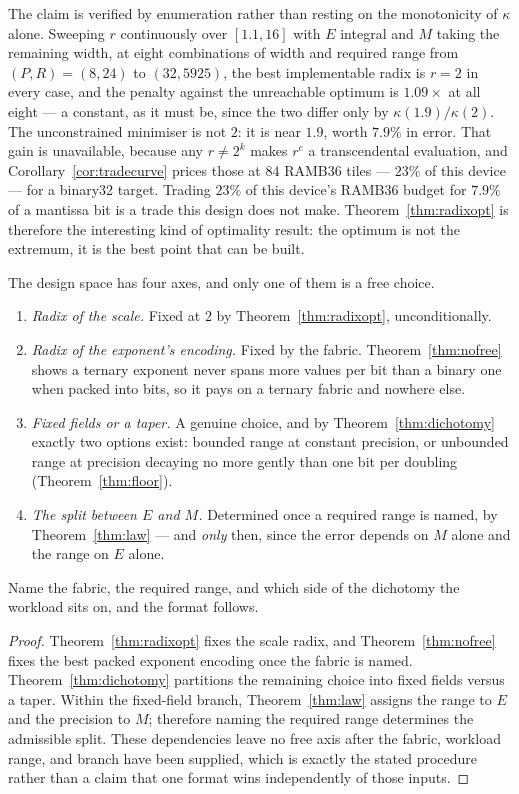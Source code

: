 The claim is verified by enumeration rather than resting on the monotonicity of
$\kappa$ alone. Sweeping $r$ continuously over $[1.1, 16]$ with $E$ integral and
$M$ taking the remaining width, at eight combinations of width and required range
from $(P,R) = (8, 24)$ to $(32, 5925)$, the best implementable radix is $r = 2$ in
every case, and the penalty against the unreachable optimum is $1.09\times$ at all
eight --- a constant, as it must be, since the two differ only by
$\kappa(1.9)/\kappa(2)$. The unconstrained minimiser is not $2$: it is near
$1.9$, worth $7.9\%$ in error. That gain is unavailable, because any
$r \neq 2^{k}$ makes $r^{e}$ a transcendental evaluation, and
Corollary~\ref{cor:tradecurve} prices those at $84$ RAMB36 tiles --- $23\%$ of
this device --- for a binary32 target. Trading $23\%$ of this device's RAMB36 budget for $7.9\%$ of a
mantissa bit is a trade this design does not make. Theorem~\ref{thm:radixopt} is therefore
the interesting kind of optimality result: the optimum is not the extremum, it is
the best point that can be built.

\begin{corollary}
\label{cor:determined}
The design space has four axes, and only one of them is a free choice.
\begin{enumerate}
\item \emph{Radix of the scale.} Fixed at $2$ by Theorem~\ref{thm:radixopt},
unconditionally.
\item \emph{Radix of the exponent's encoding.} Fixed by the fabric.
Theorem~\ref{thm:nofree} shows a ternary exponent never spans more values per bit
than a binary one when packed into bits, so it pays on a ternary fabric and
nowhere else.
\item \emph{Fixed fields or a taper.} A genuine choice, and by
Theorem~\ref{thm:dichotomy} exactly two options exist: bounded range at constant
precision, or unbounded range at precision decaying no more gently than one bit
per doubling (Theorem~\ref{thm:floor}).
\item \emph{The split between $E$ and $M$.} Determined once a required range is
named, by Theorem~\ref{thm:law} --- and \emph{only} then, since the error depends
on $M$ alone and the range on $E$ alone.
\end{enumerate}
Name the fabric, the required range, and which side of the dichotomy the workload
sits on, and the format follows.
\end{corollary}
\begin{proof}
Theorem~\ref{thm:radixopt} fixes the scale radix, and
Theorem~\ref{thm:nofree} fixes the best packed exponent encoding once the
fabric is named.  Theorem~\ref{thm:dichotomy} partitions the remaining choice
into fixed fields versus a taper.  Within the fixed-field branch,
Theorem~\ref{thm:law} assigns the range to $E$ and the precision to $M$;
therefore naming the required range determines the admissible split.  These
dependencies leave no free axis after the fabric, workload range, and branch
have been supplied, which is exactly the stated procedure rather than a claim
that one format wins independently of those inputs.
\end{proof}

